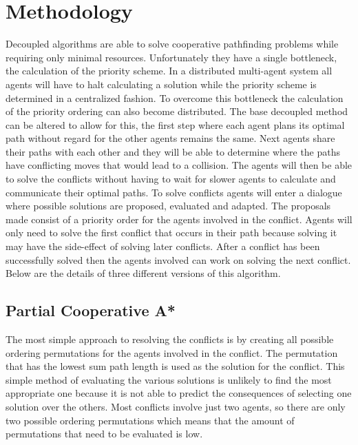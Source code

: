 \section{Methodology}\label{sec:method}
Decoupled algorithms are able to solve cooperative pathfinding problems while
requiring only minimal resources. Unfortunately they have a single bottleneck,
the calculation of the priority scheme. In a distributed multi-agent system all
agents will have to halt calculating a solution while the priority scheme is
determined in a centralized fashion. To overcome this bottleneck the
calculation of the
priority ordering can also become distributed. The base decoupled method can be
altered to allow for this, the first step where each agent plans its optimal
path without regard for the other agents remains the same. Next agents share
their paths with each other and they will be able to determine where the paths
have conflicting moves that would lead to a collision. The agents will then be
able to solve the conflicts without having to wait for slower agents to
calculate and communicate their optimal paths. To solve conflicts agents will
enter a dialogue where possible solutions are proposed, evaluated and adapted.
The proposals made consist of a priority order for the agents involved in the
conflict. Agents will only need to solve the first conflict that occurs in
their path because solving it may have the side-effect of solving later
conflicts. After a conflict has been successfully solved then the agents
involved can work on solving the next conflict.
Below are the details of three different versions of this algorithm.

\subsection{Partial Cooperative A*}
The most simple approach to resolving the conflicts is by creating all possible
ordering permutations for the agents involved in the conflict. The permutation
that has the lowest sum path length is used as the solution for the conflict.
This simple method of evaluating the various solutions is unlikely to find the
most appropriate one because it is not able to predict the consequences of
selecting one solution over the others.
Most conflicts involve just two agents, so there are only two possible ordering
permutations which means that the amount of permutations that need to be
evaluated is low.

